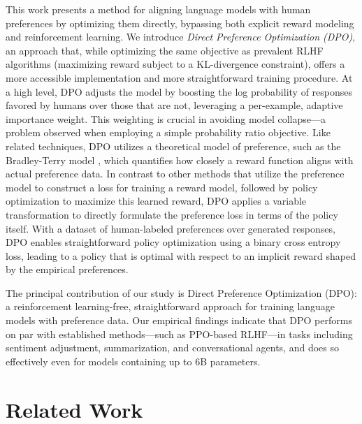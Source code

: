 This work presents a method for aligning language models with human preferences by optimizing them directly, bypassing both explicit reward modeling and reinforcement learning. We introduce \textit{Direct Preference Optimization (DPO)}, an approach that, while optimizing the same objective as prevalent RLHF algorithms (maximizing reward subject to a KL-divergence constraint), offers a more accessible implementation and more straightforward training procedure. At a high level, DPO adjusts the model by boosting the log probability of responses favored by humans over those that are not, leveraging a per-example, adaptive importance weight. This weighting is crucial in avoiding model collapse—a problem observed when employing a simple probability ratio objective. Like related techniques, DPO utilizes a theoretical model of preference, such as the Bradley-Terry model \cite{bradley1952rankanalysis}, which quantifies how closely a reward function aligns with actual preference data. In contrast to other methods that utilize the preference model to construct a loss for training a reward model, followed by policy optimization to maximize this learned reward, DPO applies a variable transformation to directly formulate the preference loss in terms of the policy itself. With a dataset of human-labeled preferences over generated responses, DPO enables straightforward policy optimization using a binary cross entropy loss, leading to a policy that is optimal with respect to an implicit reward shaped by the empirical preferences.

The principal contribution of our study is Direct Preference Optimization (DPO): a reinforcement learning-free, straightforward approach for training language models with preference data. Our empirical findings indicate that DPO performs on par with established methods—such as PPO-based RLHF—in tasks including sentiment adjustment, summarization, and conversational agents, and does so effectively even for models containing up to 6B parameters.

\section{Related Work}

